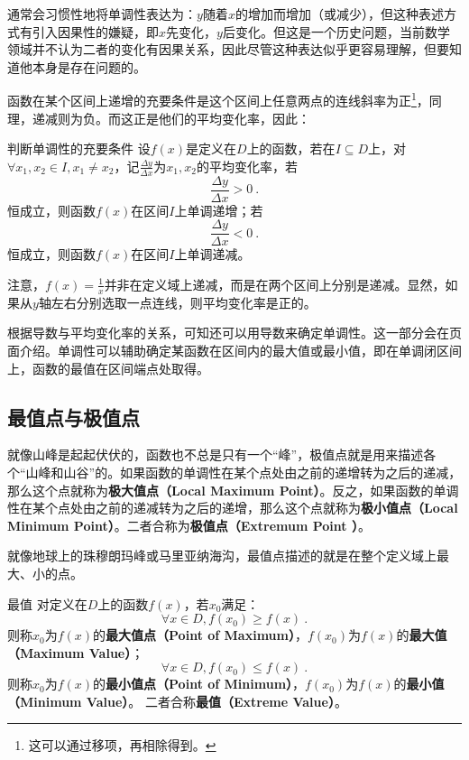 通常会习惯性地将单调性表达为：$y$随着$x$的增加而增加（或减少），但这种表述方式有引入因果性的嫌疑，即$x$先变化，$y$后变化。但这是一个历史问题，当前数学领域并不认为二者的变化有因果关系，因此尽管这种表达似乎更容易理解，但要知道他本身是存在问题的。

函数在某个区间上递增的充要条件是这个区间上任意两点的连线斜率为正\footnote{这可以通过移项，再相除得到。}，同理，递减则为负。而这正是他们的平均变化率，因此：

\begin{theorem}{判断单调性的充要条件}
设$f(x)$是定义在$D$上的函数，若在$I\subseteq D$上，对$\forall x_1,x_2\in I,x_1\neq x_2$，记$\frac{\Delta y}{\Delta x}$为$x_1,x_2$的平均变化率，若
\begin{equation}
\frac{\Delta y}{\Delta x}>0~.
\end{equation}
恒成立，则函数$f(x)$在区间$I$上单调递增；若
\begin{equation}
\frac{\Delta y}{\Delta x}<0~.
\end{equation}
恒成立，则函数$f(x)$在区间$I$上单调递减。
\end{theorem}

注意，$\displaystyle f(x)=\frac{1}{x}$并非在定义域上递减，而是在两个区间上分别是递减。显然，如果从$y$轴左右分别选取一点连线，则平均变化率是正的。

根据导数与平均变化率的关系，可知还可以用导数来确定单调性。这一部分会在页面介绍。单调性可以辅助确定某函数在区间内的最大值或最小值，即在单调闭区间上，函数的最值在区间端点处取得。

\subsection{最值点与极值点}\label{sub_HsFunC_2}

就像山峰是起起伏伏的，函数也不总是只有一个“峰”，极值点就是用来描述各个“山峰和山谷”的。如果函数的单调性在某个点处由之前的递增转为之后的递减，那么这个点就称为\textbf{极大值点（Local Maximum Point）}。反之，如果函数的单调性在某个点处由之前的递减转为之后的递增，那么这个点就称为\textbf{极小值点（Local Minimum Point）}。二者合称为\textbf{极值点（Extremum Point ）}。

就像地球上的珠穆朗玛峰或马里亚纳海沟，最值点描述的就是在整个定义域上最大、小的点。

\begin{definition}{最值}
对定义在$D$上的函数$f(x)$，若$x_0$满足：
\begin{equation}
\forall x\in D,f(x_0)\geq f(x)~.
\end{equation}
则称$x_0$为$f(x)$的\textbf{最大值点（Point of Maximum）}，$f(x_0)$为$f(x)$的\textbf{最大值（Maximum Value）}；
\begin{equation}
\forall x\in D,f(x_0)\leq f(x)~.
\end{equation}
则称$x_0$为$f(x)$的\textbf{最小值点（Point of Minimum）}，$f(x_0)$为$f(x)$的\textbf{最小值（Minimum Value）}。
二者合称\textbf{最值（Extreme Value）}。
\end{definition}

